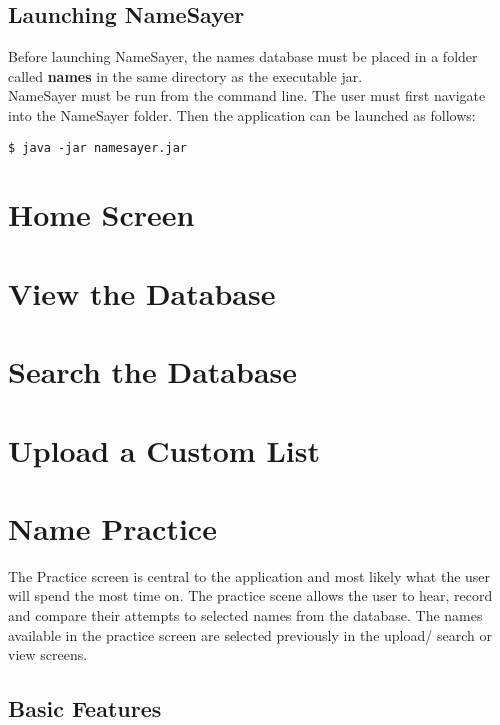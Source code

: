 \documentclass{article}
\begin{document}
\subsection{Launching NameSayer}
Before launching NameSayer, the names database must be placed in a folder called \textbf{names} in the same directory as 
the executable jar. \\

NameSayer must be run from the command line. The user must first navigate into the NameSayer folder. Then the application
can be launched as follows: 

\begin{verbatim}
$ java -jar namesayer.jar
\end{verbatim}

\section{Home Screen}

\section{View the Database}

\section{Search the Database}

\section{Upload a Custom List}

\section{Name Practice}
The Practice screen is central to the application and most likely what the user will spend the most time on. The practice
scene allows the user to hear, record and compare their attempts to selected names from the database. The names available 
in the practice screen are selected previously in the upload/ search or view screens. 

\subsection{Basic Features}
\end{document}

